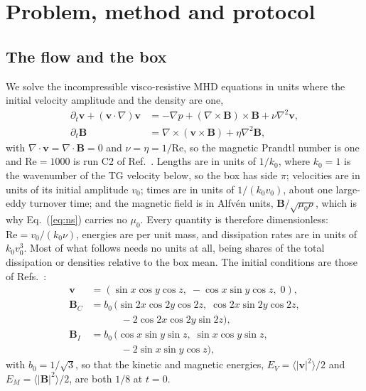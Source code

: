 \documentclass[aip,pop,reprint,amsmath,amssymb,superscriptaddress,floatfix]{revtex4-2}
\newcommand{\Rey}{\mathrm{Re}}
\newcommand{\vv}{\bm{v}}
\newcommand{\BB}{\bm{B}}
\begin{document}
\section{Problem, method and protocol}
\label{sec:method}

\subsection{The flow and the box}

We solve the incompressible visco-resistive MHD equations in units where the initial
velocity amplitude and the density are one,
\begin{align}
  \partial_t \vv + (\vv\cdot\nabla)\vv &= -\nabla p + (\nabla\times\BB)\times\BB
     + \nu\nabla^2\vv, \label{eq:ns}\\
  \partial_t \BB &= \nabla\times(\vv\times\BB) + \eta\nabla^2\BB, \label{eq:ind}
\end{align}
with $\nabla\cdot\vv=\nabla\cdot\BB=0$ and $\nu=\eta=1/\Rey$, so the magnetic Prandtl
number is one and $\Rey=1000$ is run C2 of Ref.~. Lengths are
in units of $1/k_0$, where $k_0=1$ is the wavenumber of the TG velocity below, so the
box has side $\pi$; velocities are in units of its initial amplitude $v_0$; times are in
units of $1/(k_0v_0)$, about one large-eddy turnover time; and the magnetic field is in
Alfv\'en units, $\BB/\sqrt{\mu_0\rho}$, which is why Eq.~(\ref{eq:ns}) carries no
$\mu_0$. Every quantity is therefore dimensionless: $\Rey=v_0/(k_0\nu)$, energies are
per unit mass, and dissipation rates are in units of $k_0v_0^3$. Most of what follows
needs no units at all, being shares of the total dissipation or densities relative to
the box mean. The initial conditions are those of
Refs.~:
\begin{align}
  \vv &= (\sin x\cos y\cos z,\; -\cos x\sin y\cos z,\; 0), \label{eq:v0}\\
  \BB_C &= b_0\,(\sin 2x\cos 2y\cos 2z,\; \cos 2x\sin 2y\cos 2z, \nonumber\\
        &\qquad\quad -2\cos 2x\cos 2y\sin 2z), \label{eq:bc}\\
  \BB_I &= b_0\,(\cos x\sin y\sin z,\; \sin x\cos y\sin z, \nonumber\\
        &\qquad\quad -2\sin x\sin y\cos z), \label{eq:bi}
\end{align}
with $b_0=1/\sqrt3$, so that the kinetic and magnetic energies,
$E_V=\langle|\vv|^2\rangle/2$ and $E_M=\langle|\BB|^2\rangle/2$, are both $1/8$ at
$t=0$.
\end{document}
